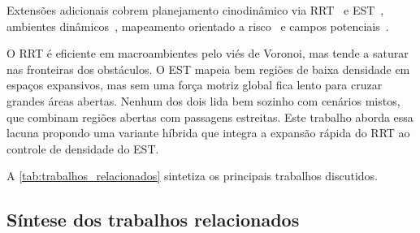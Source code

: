 Extensões adicionais cobrem planejamento cinodinâmico via RRT~\cite{LaValle1999RandomizedKP} e EST~\cite{hsu2002randomized}, ambientes dinâmicos~\cite{guvenkaya2024local}, mapeamento orientado a risco~\cite{laconte2021lambda} e campos potenciais~\cite{khatib1986real}.

O RRT é eficiente em macroambientes pelo viés de Voronoi, mas tende a saturar nas fronteiras dos obstáculos. O EST mapeia bem regiões de baixa densidade em espaços expansivos, mas sem uma força motriz global fica lento para cruzar grandes áreas abertas. Nenhum dos dois lida bem sozinho com cenários mistos, que combinam regiões abertas com passagens estreitas. Este trabalho aborda essa lacuna propondo uma variante híbrida que integra a expansão rápida do RRT ao controle de densidade do EST.

A \autoref{tab:trabalhos_relacionados} sintetiza os principais trabalhos discutidos.

\subsection{Síntese dos trabalhos relacionados}

